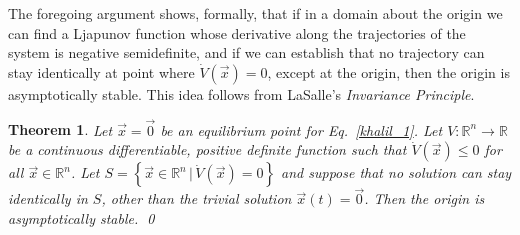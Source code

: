 \documentclass[11pt,a4paper,oneside]{book}
\numberwithin{equation}{section}
\theoremstyle{it}
\newtheorem{thm}{Theorem}[chapter]
\theoremstyle{definition}
\newtheorem{example}{Example}[chapter]
\begin{document}
The foregoing argument shows, formally, that if in a domain about the origin we 
can find a Ljapunov function whose derivative along the trajectories of the 
system is negative semidefinite, and if we can establish that no trajectory can 
stay identically at point where $\dot{V}(\vec{x})=0$, except at the origin, 
then the origin is asymptotically stable. This idea follows from LaSalle's 
\textit{Invariance Principle}.
\begin{thm}
	Let $\vec{x}=\vec{0}$ be an equilibrium point for Eq.~\eqref{khalil_1}. Let 
	$V:\mathbb{R}^n\rightarrow\mathbb{R}$ be a continuous differentiable, 
	positive definite function such that $\dot{V}(\vec{x})\le0$ for all 
	$\vec{x}\in\mathbb{R}^n$. Let $S=\left\lbrace 
	\vec{x}\in\mathbb{R}^n\,|\,\dot{V}(\vec{x})=0\right\rbrace$ and suppose 
	that no solution can stay identically in $S$, other than the trivial 
	solution $\vec{x}(t)=\vec{0}$. Then the origin is asymptotically stable.
	\qed
\end{thm}
\end{document}
